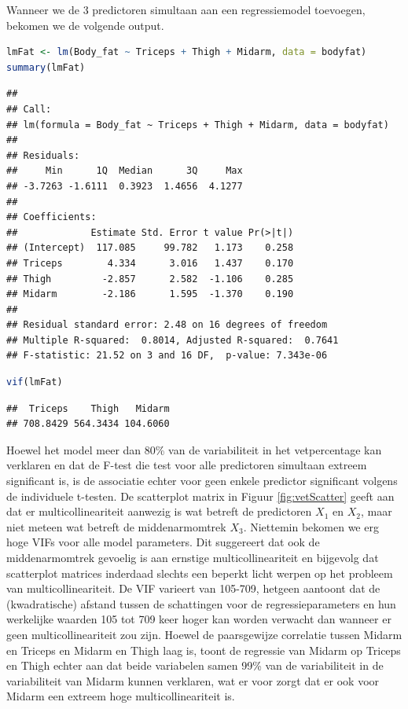 \documentclass[
  12pt,dutch,coursenotes]{book}
\theoremstyle{definition}
\theoremstyle{definition}
\theoremstyle{definition}
\theoremstyle{definition}
\theoremstyle{remark}
\begin{document}
Wanneer we de 3 predictoren simultaan aan een regressiemodel toevoegen, bekomen we de volgende output.

\begin{lstlisting}[language=R]
lmFat <- lm(Body_fat ~ Triceps + Thigh + Midarm, data = bodyfat)
summary(lmFat)
\end{lstlisting}

\begin{lstlisting}
## 
## Call:
## lm(formula = Body_fat ~ Triceps + Thigh + Midarm, data = bodyfat)
## 
## Residuals:
##     Min      1Q  Median      3Q     Max 
## -3.7263 -1.6111  0.3923  1.4656  4.1277 
## 
## Coefficients:
##             Estimate Std. Error t value Pr(>|t|)
## (Intercept)  117.085     99.782   1.173    0.258
## Triceps        4.334      3.016   1.437    0.170
## Thigh         -2.857      2.582  -1.106    0.285
## Midarm        -2.186      1.595  -1.370    0.190
## 
## Residual standard error: 2.48 on 16 degrees of freedom
## Multiple R-squared:  0.8014, Adjusted R-squared:  0.7641 
## F-statistic: 21.52 on 3 and 16 DF,  p-value: 7.343e-06
\end{lstlisting}

\begin{lstlisting}[language=R]
vif(lmFat)
\end{lstlisting}

\begin{lstlisting}
##  Triceps    Thigh   Midarm 
## 708.8429 564.3434 104.6060
\end{lstlisting}

Hoewel het model meer dan 80\% van de variabiliteit in het vetpercentage kan verklaren en dat de F-test die test voor alle predictoren simultaan extreem significant is, is de associatie echter voor geen enkele predictor significant volgens de individuele t-testen.
De scatterplot matrix in Figuur \ref{fig:vetScatter} geeft aan dat er multicollineariteit aanwezig is wat betreft de predictoren \(X_1\) en \(X_2\), maar niet meteen wat betreft de middenarmomtrek \(X_3\). Niettemin bekomen we erg hoge VIFs voor alle model parameters.
Dit suggereert dat ook de middenarmomtrek gevoelig is aan ernstige multicollineariteit en bijgevolg dat scatterplot matrices inderdaad slechts een beperkt licht werpen op het probleem van multicollineariteit.
De VIF varieert van 105-709, hetgeen aantoont dat de (kwadratische) afstand tussen de schattingen voor de regressieparameters en hun werkelijke waarden 105 tot 709 keer hoger kan worden verwacht dan wanneer er geen multicollineariteit zou zijn.
Hoewel de paarsgewijze correlatie tussen Midarm en Triceps en Midarm en Thigh laag is, toont de regressie van Midarm op Triceps en Thigh echter aan dat beide variabelen samen 99\% van de variabiliteit in de variabiliteit van Midarm kunnen verklaren, wat er voor zorgt dat er ook voor Midarm een extreem hoge multicollineariteit is.
\end{document}
